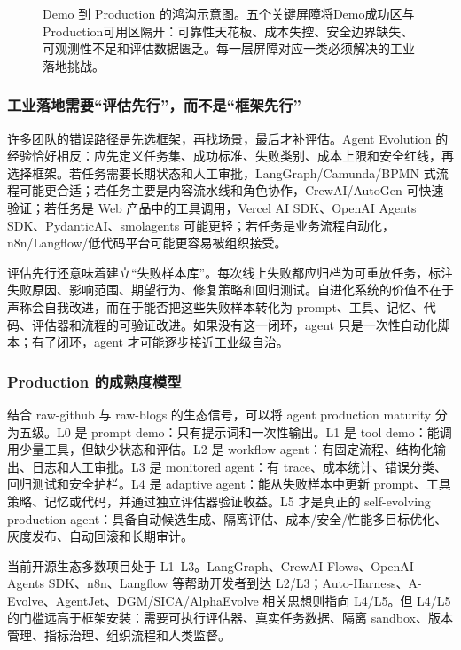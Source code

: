 \begin{figure}[htbp]
\begin{tikzpicture}
\end{tikzpicture}
\caption{Demo 到 Production 的鸿沟示意图。五个关键屏障将Demo成功区与Production可用区隔开：可靠性天花板、成本失控、安全边界缺失、可观测性不足和评估数据匮乏。每一层屏障对应一类必须解决的工业落地挑战。}
\label{fig:ch6-gap-diagram}
\end{figure}

\subsubsection{工业落地需要``评估先行''，而不是``框架先行''}

许多团队的错误路径是先选框架，再找场景，最后才补评估。Agent Evolution 的经验恰好相反：应先定义任务集、成功标准、失败类别、成本上限和安全红线，再选择框架。若任务需要长期状态和人工审批，LangGraph/Camunda/BPMN 式流程可能更合适；若任务主要是内容流水线和角色协作，CrewAI/AutoGen 可快速验证；若任务是 Web 产品中的工具调用，Vercel AI SDK、OpenAI Agents SDK、PydanticAI、smolagents 可能更轻；若任务是业务流程自动化，n8n/Langflow/低代码平台可能更容易被组织接受。

评估先行还意味着建立``失败样本库''。每次线上失败都应归档为可重放任务，标注失败原因、影响范围、期望行为、修复策略和回归测试。自进化系统的价值不在于声称会自我改进，而在于能否把这些失败样本转化为 prompt、工具、记忆、代码、评估器和流程的可验证改进。如果没有这一闭环，agent 只是一次性自动化脚本；有了闭环，agent 才可能逐步接近工业级自治。

\subsubsection{Production 的成熟度模型}

结合 raw-github 与 raw-blogs 的生态信号，可以将 agent production maturity 分为五级。L0 是 prompt demo：只有提示词和一次性输出。L1 是 tool demo：能调用少量工具，但缺少状态和评估。L2 是 workflow agent：有固定流程、结构化输出、日志和人工审批。L3 是 monitored agent：有 trace、成本统计、错误分类、回归测试和安全护栏。L4 是 adaptive agent：能从失败样本中更新 prompt、工具策略、记忆或代码，并通过独立评估器验证收益。L5 才是真正的 self-evolving production agent：具备自动候选生成、隔离评估、成本/安全/性能多目标优化、灰度发布、自动回滚和长期审计。

当前开源生态多数项目处于 L1--L3。LangGraph、CrewAI Flows、OpenAI Agents SDK、n8n、Langflow 等帮助开发者到达 L2/L3；Auto-Harness、A-Evolve、AgentJet、DGM/SICA/AlphaEvolve 相关思想则指向 L4/L5。但 L4/L5 的门槛远高于框架安装：需要可执行评估器、真实任务数据、隔离 sandbox、版本管理、指标治理、组织流程和人类监督。


